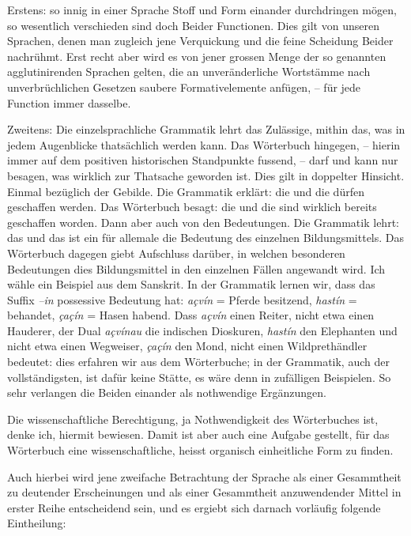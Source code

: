 Erstens: so innig in einer Sprache Stoff und Form einander durchdringen mögen, so wesentlich verschieden sind doch Beider Functionen. Dies gilt von unseren Sprachen, denen man zugleich jene Verquickung und die feine Scheidung Beider nachrühmt. Erst recht aber wird es von jener grossen Menge der so genannten agglutinirenden Sprachen gelten, die an unveränderliche Wortstämme nach unverbrüchlichen Gesetzen saubere Formativelemente anfügen, – für jede Function immer dasselbe.

Zweitens: Die einzelsprachliche Grammatik lehrt das Zulässige, mithin das, was in jedem Augenblicke thatsächlich werden kann. Das Wörterbuch hingegen, – hierin immer auf dem positiven historischen Standpunkte fussend, – darf und kann nur besagen, was wirklich zur Thatsache geworden ist. Dies \label{sp.123} gilt in doppelter Hinsicht. Einmal bezüglich der Gebilde. Die Grammatik erklärt: die und die dürfen geschaffen werden. Das Wörterbuch besagt: die und die sind wirklich bereits geschaffen worden. Dann aber auch von den Bedeutungen. Die Grammatik lehrt: das und das ist ein für allemale die Bedeutung des einzelnen Bildungsmittels. Das Wörterbuch dagegen giebt Aufschluss darüber, in welchen besonderen Bedeutungen dies Bildungsmittel in den einzelnen Fällen angewandt wird. Ich wähle ein Beispiel aus dem Sanskrit. In der Grammatik lernen wir, dass das Suffix \textit{–in }possessive Bedeutung hat: \textit{açvín} = Pferde besitzend, \textit{hastín} = behandet, \textit{çaçín} = Hasen habend. Dass \textit{açvín} einen Reiter, nicht etwa einen Hauderer, der Dual \textit{açvínau} die indischen Dioskuren, \textit{hastín} den Elephanten und nicht etwa einen Wegweiser, \textit{çaçín} den Mond, nicht einen Wildprethändler bedeutet: dies erfahren wir aus dem Wörterbuche; in der Grammatik, auch der vollständigsten, ist dafür keine Stätte, es wäre denn in zufälligen Beispielen. So sehr verlangen die Beiden einander als nothwendige Ergänzungen.

\largerpage[2]Die wissenschaftliche Berechtigung, ja Nothwendigkeit des Wörterbuches ist, denke ich, hiermit bewiesen. Damit ist aber auch eine Aufgabe gestellt, für das Wörterbuch eine wissenschaftliche,  heisst organisch einheitliche Form zu finden.

Auch hierbei wird jene zweifache Betrachtung der Sprache als einer Gesammtheit zu deutender Erscheinungen und als einer Gesammtheit anzuwendender Mittel in erster Reihe entscheidend sein, und es ergiebt sich darnach vorläufig folgende Eintheilung:

